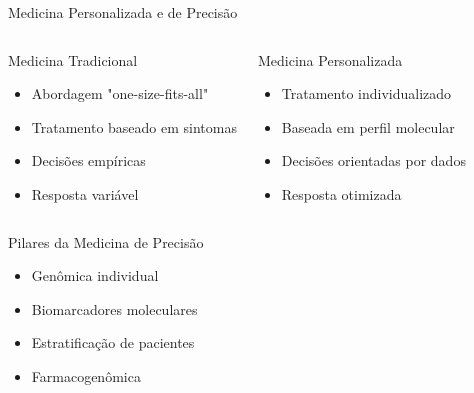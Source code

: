 \begin{frame}{Medicina Personalizada e de Precisão}
\begin{columns}
\begin{block}{Medicina Tradicional}
\begin{itemize}
    \item Abordagem "one-size-fits-all"
    \item Tratamento baseado em sintomas
    \item Decisões empíricas
    \item Resposta variável
\end{itemize}
\end{block}

\begin{block}{Medicina Personalizada}
\begin{itemize}
    \item Tratamento individualizado
    \item Baseada em perfil molecular
    \item Decisões orientadas por dados
    \item Resposta otimizada
\end{itemize}
\end{block}
\end{columns}

\vspace{0.5cm}


\begin{exampleblock}{Pilares da Medicina de Precisão}
\begin{itemize}
    \item Genômica individual
    \item Biomarcadores moleculares
    \item Estratificação de pacientes
    \item Farmacogenômica
\end{itemize}
\end{exampleblock}
\end{frame}

